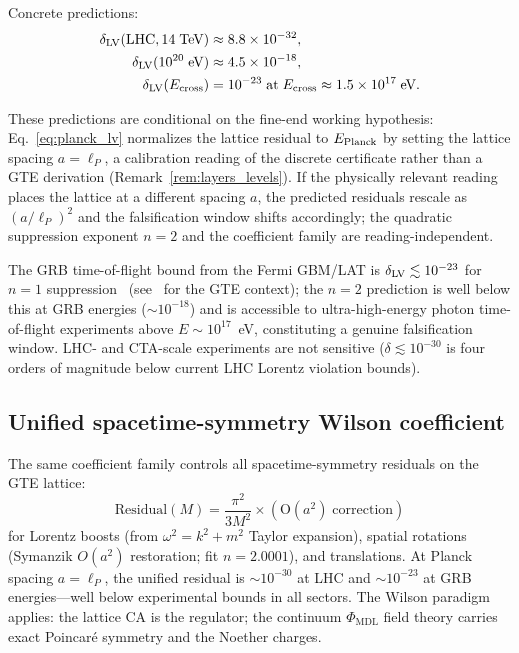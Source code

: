 \documentclass[11pt]{article}
\theoremstyle{remark}
\newcommand{\PHIMDL}{\Phi_{\mathrm{MDL}}}
\begin{document}
Concrete predictions:
\begin{align}
  \delta_{\rm LV}(\text{LHC}, 14\;\text{TeV}) &\approx 8.8\times10^{-32}, \\
  \delta_{\rm LV}(10^{20}\;\text{eV}) &\approx 4.5\times10^{-18}, \\
  \delta_{\rm LV}(E_{\rm cross}) &= 10^{-23} \;\text{at}\;
    E_{\rm cross}\approx 1.5\times10^{17}\;\text{eV}.
\end{align}

These predictions are conditional on the fine-end working hypothesis:
Eq.~\eqref{eq:planck_lv} normalizes the lattice residual to $E_{\rm Planck}$
by setting the lattice spacing $a=\ell_P$, a calibration reading of the
discrete certificate rather than a GTE derivation
(Remark~\ref{rem:layers_levels}).  If the physically relevant reading places
the lattice at a different spacing $a$, the predicted residuals rescale as
$(a/\ell_P)^2$ and the falsification window shifts accordingly; the
quadratic suppression exponent $n=2$ and the coefficient family are
reading-independent.

The GRB time-of-flight bound from the Fermi GBM/LAT is $\delta_{\rm LV}\lesssim
10^{-23}$ for $n=1$ suppression~\cite{Abdo2009}
(see~\cite{SpivackGTEMobius} for the GTE context); the $n=2$ prediction
is well below this at GRB energies ($\sim10^{-18}$) and is accessible
to ultra-high-energy photon time-of-flight experiments above
$E\sim10^{17}$~eV, constituting a genuine falsification window.
LHC- and CTA-scale experiments are not sensitive ($\delta\lesssim10^{-30}$
is four orders of magnitude below current LHC Lorentz violation bounds).

\subsection{Unified spacetime-symmetry Wilson coefficient}
\label{ssec:wilson}

The same coefficient family controls all spacetime-symmetry residuals on the
GTE lattice:
\begin{equation}
  \label{eq:wilson}
  \mathrm{Residual}(M) = \frac{\pi^2}{3M^2} \times (\text{O}(a^2)\;\text{correction})
\end{equation}
for Lorentz boosts (from $\omega^2=k^2+m^2$ Taylor expansion), spatial
rotations (Symanzik $O(a^2)$ restoration; fit $n=2.0001$), and
translations.  At Planck spacing $a=\ell_P$, the unified residual is
$\sim10^{-30}$ at LHC and $\sim10^{-23}$ at GRB energies---well below
experimental bounds in all sectors.
The Wilson paradigm applies: the lattice CA is the regulator;
the continuum $\PHIMDL$ field theory carries exact Poincar\'e symmetry and
the Noether charges.
\end{document}
